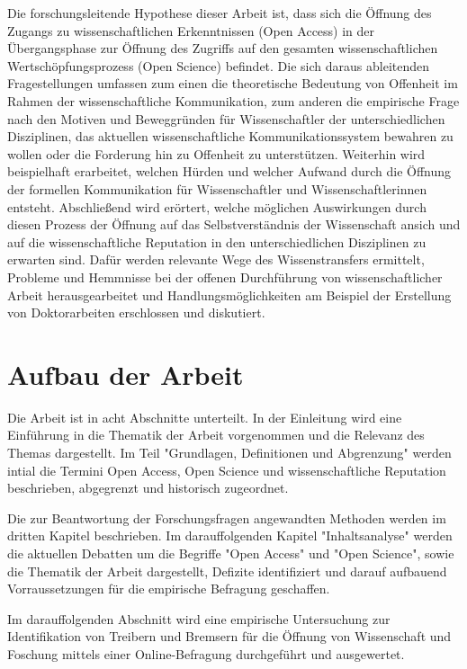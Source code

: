Die forschungsleitende Hypothese dieser Arbeit ist, dass sich die Öffnung des Zugangs zu wissenschaftlichen Erkenntnissen (Open Access) in der Übergangsphase zur Öffnung des Zugriffs auf den gesamten wissenschaftlichen Wertschöpfungsprozess (Open Science) befindet. Die sich daraus ableitenden Fragestellungen umfassen zum einen die theoretische Bedeutung von Offenheit im Rahmen der wissenschaftliche Kommunikation, zum anderen die empirische Frage nach den Motiven und Beweggründen für Wissenschaftler der unterschiedlichen Disziplinen, das aktuellen wissenschaftliche Kommunikationssystem bewahren zu wollen oder die Forderung hin zu Offenheit zu unterstützen. Weiterhin wird beispielhaft erarbeitet, welchen Hürden und welcher Aufwand durch die Öffnung der formellen Kommunikation für Wissenschaftler und Wissenschaftlerinnen entsteht. Abschließend wird erörtert, welche möglichen Auswirkungen durch diesen Prozess der Öffnung auf das Selbstverständnis der Wissenschaft ansich und auf die wissenschaftliche Reputation in den unterschiedlichen Disziplinen zu erwarten sind. Dafür werden relevante Wege des Wissenstransfers ermittelt, Probleme und Hemmnisse bei der offenen Durchführung von wissenschaftlicher Arbeit herausgearbeitet und Handlungsmöglichkeiten am Beispiel der Erstellung von Doktorarbeiten erschlossen und diskutiert.

\section{Aufbau der Arbeit}

Die Arbeit ist in acht Abschnitte unterteilt. In der Einleitung wird eine Einführung in die Thematik der Arbeit vorgenommen und die Relevanz des Themas dargestellt. Im Teil "Grundlagen, Definitionen und Abgrenzung" werden intial die Termini Open Access, Open Science und wissenschaftliche Reputation beschrieben, abgegrenzt und historisch zugeordnet.

Die zur Beantwortung der Forschungsfragen angewandten Methoden werden im dritten Kapitel beschrieben. Im darauffolgenden Kapitel "Inhaltsanalyse" werden die aktuellen Debatten um die Begriffe "Open Access" und "Open Science", sowie die Thematik der Arbeit dargestellt, Defizite identifiziert und darauf aufbauend Vorraussetzungen für die empirische Befragung geschaffen.

Im darauffolgenden Abschnitt wird eine empirische Untersuchung zur Identifikation von Treibern und Bremsern für die Öffnung von Wissenschaft und Foschung mittels einer Online-Befragung durchgeführt und ausgewertet.

